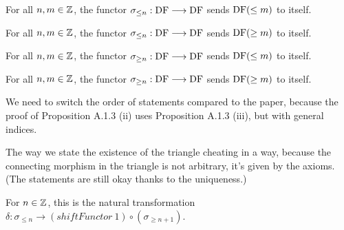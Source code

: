 \begin{proposition}
\label{prop-truncLE_LE}
\leanok
{}

For all $n,m\in\mathbb{Z}$, the functor $\sigma_{\le n} : \operatorname{DF} \longrightarrow \operatorname{DF}$ sends $\operatorname{DF}(\le m)$ to itself.

\end{proposition}

\begin{proposition}
\label{prop-truncLE_GE}
\leanok
{}

For all $n,m\in\mathbb{Z}$, the functor $\sigma_{\le n} : \operatorname{DF} \longrightarrow \operatorname{DF}$ sends $\operatorname{DF}(\ge m)$ to itself.

\end{proposition}

\begin{proposition}
\label{prop-truncGE_LE}
\leanok
{}

For all $n,m\in\mathbb{Z}$, the functor $\sigma_{\ge n} : \operatorname{DF} \longrightarrow \operatorname{DF}$ sends $\operatorname{DF}(\le m)$ to itself.

\end{proposition}

\begin{proposition}
\label{prop-truncGE_GE}
\leanok
{}

For all $n,m\in\mathbb{Z}$, the functor $\sigma_{\ge n} : \operatorname{DF} \longrightarrow \operatorname{DF}$ sends $\operatorname{DF}(\ge m)$ to itself.

\end{proposition}

We need to switch the order of statements compared to the paper, because the proof of Proposition A.1.3 (ii) uses Proposition A.1.3 (iii),
but with general indices.

The way we state the existence of the triangle cheating in a way, because the connecting morphism in the triangle is not arbitrary,
it's given by the axioms. (The statements are still okay thanks to the uniqueness.)


\begin{definition}
\label{def-triangleGELE_delta}
\leanok
{}

For $n\in\mathbb{Z}$, this is the natural transformation $\delta\colon \sigma_{\le n} \to 
(shiftFunctor\ 1) \circ (\sigma_{\ge n + 1})$.

\end{definition}

